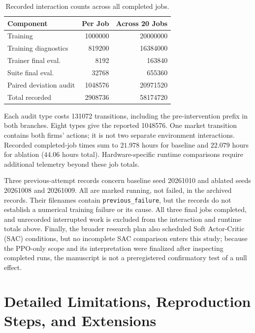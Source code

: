 \documentclass{article}
\begin{document}
\begin{table}[H]
\centering
\caption{Recorded interaction counts across all completed jobs.}
\label{tab:interactions}
\small
\begin{tabular}{@{}lrr@{}}
\toprule
Component & Per Job & Across 20 Jobs \\
\midrule
Training              & \num{1000000}  & \num{20000000} \\
Training diagnostics  & \num{819200}   & \num{16384000} \\
Trainer final eval.   & \num{8192}     & \num{163840} \\
Suite final eval.     & \num{32768}    & \num{655360} \\
Paired deviation audit & \num{1048576} & \num{20971520} \\
\midrule
Total recorded        & \num{2908736}  & \num{58174720} \\
\bottomrule
\end{tabular}
\end{table}

Each audit type costs \num{131072} transitions, including the pre-intervention prefix in both branches. Eight types give the reported \num{1048576}. One market transition contains both firms' actions; it is not two separate environment interactions. Recorded completed-job times sum to $21.978$ hours for baseline and $22.079$ hours for ablation ($44.06$ hours total). Hardware-specific runtime comparisons require additional telemetry beyond these job totals.

Three previous-attempt records concern baseline seed 20261010 and ablated seeds 20261008 and 20261009. All are marked running, not failed, in the archived records. Their filenames contain \texttt{previous\_failure}, but the records do not establish a numerical training failure or its cause. All three final jobs completed, and unrecorded interrupted work is excluded from the interaction and runtime totals above. Finally, the broader research plan also scheduled Soft Actor-Critic (SAC) conditions, but no incomplete SAC comparison enters this study; because the PPO-only scope and its interpretation were finalized after inspecting completed runs, the manuscript is not a preregistered confirmatory test of a null effect.

\section{Detailed Limitations, Reproduction Steps, and Extensions}
\end{document}

